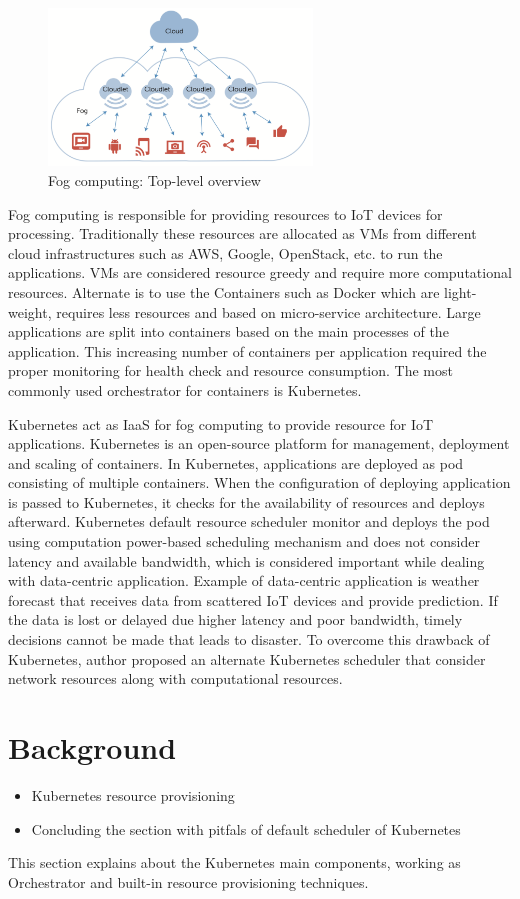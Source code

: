 \begin{figure}
  \includegraphics[width=70mm]{figures/mlcn-fog-1.pdf}
  \caption{Fog computing: Top-level overview\cite{Bittencourt2017}}
  \label{fig:fog-arch}
\end{figure}
Fog computing is responsible for providing resources to IoT devices for processing. Traditionally these resources are allocated as VMs from different cloud infrastructures such as AWS, Google, OpenStack, etc. to run the applications. VMs are considered resource greedy and require more computational resources. Alternate is to use the Containers such as Docker which are light-weight, requires less resources and based on micro-service architecture. Large applications are split into containers based on the main processes of the application. This increasing number of containers per application required the proper monitoring for health check and resource consumption. The most commonly used orchestrator for containers is Kubernetes. \par
Kubernetes act as IaaS for fog computing to provide resource for IoT applications. Kubernetes is an open-source platform for management, deployment and scaling of containers. In Kubernetes, applications are deployed as pod consisting of multiple containers. When the configuration of deploying application is passed to Kubernetes, it checks for the availability of resources and deploys afterward. Kubernetes default resource scheduler monitor and deploys the pod using computation power-based scheduling mechanism and does not consider latency and available bandwidth, which is considered important while dealing with data-centric application. Example of data-centric application is weather forecast that receives data from scattered IoT devices and provide prediction. If the data is lost or delayed due higher latency and poor bandwidth, timely decisions cannot be made that leads to disaster. To overcome this drawback of Kubernetes, author proposed an alternate Kubernetes scheduler that consider network resources along with computational resources.
\section{Background}
\label{sec:backgroud}
\begin{itemize}
  \item Kubernetes resource provisioning
  \item Concluding the section with pitfals of default scheduler of Kubernetes
\end{itemize}
This section explains about the Kubernetes main components, working as Orchestrator and built-in resource provisioning techniques.

